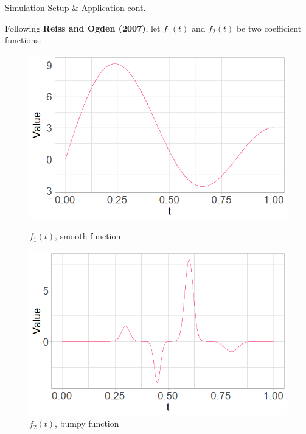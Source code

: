 \documentclass{beamer}
\begin{document}
	
	\begin{frame}{Simulation Setup \& Application cont.}

		Following \textbf{Reiss and Ogden (2007)}, let $f_1(t)$ and $f_2(t)$ be two coefficient functions: 

		\vspace{0.1cm}
		\begin{figure}
			\centering
			\begin{minipage}{.5\textwidth}
				\centering
  				\includegraphics[width=\textwidth]{smooth_function.png}
  				\caption{$f_1(t)$, smooth function}
  				\label{fig:test1}
			\end{minipage}%
			\begin{minipage}{.5\textwidth}
	  			\centering
  				\includegraphics[width=\textwidth]{bumpy_function.png}
  				\caption{$f_2(t)$, bumpy function}
  				\label{fig:test2}
			\end{minipage}
		\end{figure}
		
	\end{frame}	
\end{document}
